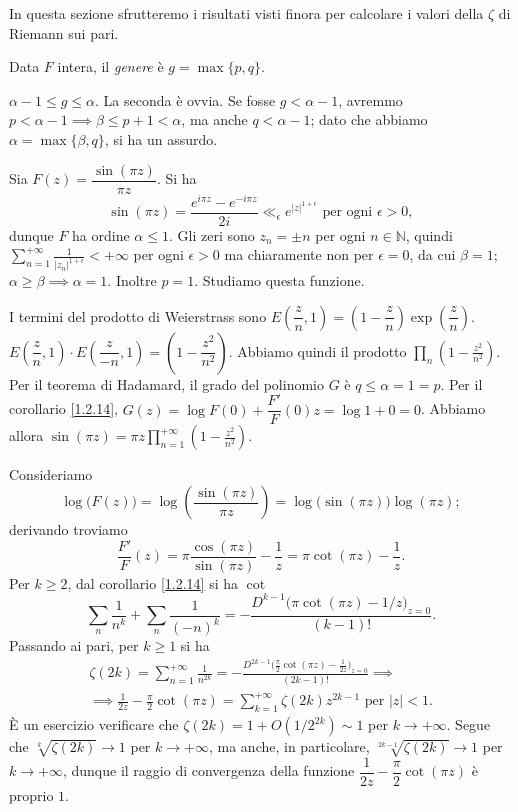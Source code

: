 In questa sezione sfrutteremo i risultati visti finora per calcolare i valori della $\zeta$ di Riemann sui pari.

\begin{defn}
  Data $F$ intera, il \textit{genere} è $g=\max\{p,q\}$.
\end{defn}

\begin{oss}
  $\alpha-1 \le g \le \alpha$. La seconda è ovvia. Se fosse $g<\alpha-1$, avremmo $p<\alpha-1 \implies \beta \le p+1<\alpha$, ma anche $q<\alpha-1$; dato che abbiamo $\alpha=\max\{\beta,q\}$, si ha un assurdo.
\end{oss}

\begin{ex}
  Sia $F(z)=\dfrac{\sin(\pi z)}{\pi z}$. Si ha
  $$\sin(\pi z)=\frac{e^{i\pi z}-e^{-i\pi z}}{2i} \ll_{\epsilon} e^{|z|^{1+\epsilon}} \text{ per ogni } \epsilon>0,$$
  dunque $F$ ha ordine $\alpha \le 1$. Gli zeri sono $z_n=\pm n$ per ogni $n \in \mathbb{N}$, quindi $\displaystyle \sum_{n=1}^{+\infty} \frac{1}{|z_n|^{1+\epsilon}}<+\infty$ per ogni $\epsilon>0$ ma chiaramente non per $\epsilon=0$, da cui $\beta=1$;
  $\alpha \ge \beta \implies \alpha=1$. Inoltre $p=1$. Studiamo questa funzione.
\end{ex}

I termini del prodotto di Weierstrass sono $E\left(\dfrac{z}{n},1\right)=\left(1-\dfrac{z}{n}\right)\exp\left(\dfrac{z}{n}\right)$. $E\left(\dfrac{z}{n},1\right) \cdot E\left(\dfrac{z}{-n},1\right)=\left(1-\dfrac{z^2}{n^2}\right)$.
Abbiamo quindi il prodotto $\displaystyle \prod_n \left(1-\frac{z^2}{n^2}\right)$. Per il teorema di Hadamard, il grado del polinomio $G$ è $q \le \alpha=1=p$. Per il corollario \ref{1.2.14}, $G(z)=\log{F(0)}+\dfrac{F'}{F}(0)z=\log{1}+0=0$.
Abbiamo allora $\displaystyle \sin(\pi z)=\pi z\prod_{n=1}^{+\infty} \left(1-\frac{z^2}{n^2}\right)$.

Consideriamo
$$\log\big(F(z)\big)=\log\left(\frac{\sin(\pi z)}{\pi z}\right)=\log\big(\sin(\pi z)\big)\log(\pi z);$$
derivando troviamo
$$\frac{F'}{F}(z)=\pi\frac{\cos(\pi z)}{\sin(\pi z)}-\frac{1}{z}=\pi\cot(\pi z)-\frac{1}{z}.$$
Per $k \ge 2$, dal corollario \ref{1.2.14} si ha $\cot$
$$\sum_n \frac{1}{n^k}+\sum_n \frac{1}{(-n)^k}=-\frac{D^{k-1}\big(\pi\cot(\pi z)-1/z\big)_{z=0}}{(k-1)!}.$$
Passando ai pari, per $k \ge 1$ si ha
\begin{gather*}
  \zeta(2k)=\sum_{n=1}^{+\infty} \frac{1}{n^{2k}}=-\frac{D^{2k-1}\big(\frac{\pi}{2}\cot(\pi z)-\frac{1}{2z}\big)_{z=0}}{(2k-1)!} \implies \\
  \implies \frac{1}{2z}-\frac{\pi}{2}\cot(\pi z)=\sum_{k=1}^{+\infty} \zeta(2k)z^{2k-1} \text{ per } |z|<1.
\end{gather*}
È un esercizio verificare che $\zeta(2k)=1+O(1/2^{2k}) \sim 1$ per $k \longrightarrow +\infty$. Segue che $\sqrt[k]{\zeta(2k)} \longrightarrow 1$ per $k \longrightarrow +\infty$, ma anche, in particolare, $\sqrt[2k-1]{\zeta(2k)} \longrightarrow 1$ per $k \longrightarrow +\infty$, dunque il raggio di convergenza della funzione $\dfrac{1}{2z}-\dfrac{\pi}{2}\cot(\pi z)$ è proprio $1$.

